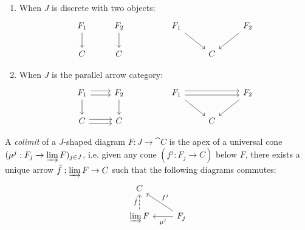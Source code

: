\documentclass[12pt]{article}
\begin{document}
\begin{example}
	\hfill
	\begin{enumerate}
		\item When $J$ is discrete with two objects:
			\begin{equation*}
\begin{tikzcd}
F_1 \arrow[d] & F_2 \arrow[d] &  & F_1 \arrow[rd] &   & F_2 \arrow[ld] \\
C             & C             &  &                & C &               
\end{tikzcd}
			\end{equation*}
		
		\item When $J$ is the parallel arrow category:
			\begin{equation*}
\begin{tikzcd}
F_1 \arrow[r, shift left] \arrow[r, shift right] \arrow[d] & F_2 \arrow[d] &  & F_1 \arrow[rd] \arrow[rr, shift right] \arrow[rr, shift left] &   & F_2 \arrow[ld] \\
C \arrow[r, shift right] \arrow[r, shift left]             & C             &  &                                                               & C &               
\end{tikzcd}
			\end{equation*}
	\end{enumerate}
\end{example}

\begin{definition}
	A \emph{colimit} of a $J$-shaped diagram $F:J\to \cat{C}$ is the apex of a universal cone $(\mu^j: F_j\to \varinjlim F)_{j\in J}$, i.e. given any cone $(f^j: F_j\to C)$ below $F$, there exists a unique arrow $\hat{f}:\varinjlim F\to C$ such that the following diagrams commutes:
	\begin{equation*}
\begin{tikzcd}
C                                         &                                           \\
\varinjlim F \arrow[u, "\hat{f}", dashed] & F_j \arrow[l, "\mu^j"] \arrow[lu, "f^j"']
\end{tikzcd}
	\end{equation*}
\end{definition}
\end{document}
